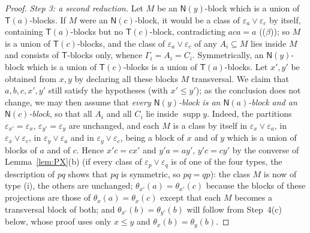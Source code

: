 \documentclass[11pt]{amsart}
\theoremstyle{definition}
\newcommand{\supp}{\operatorname{supp}}
\newcommand{\T}{\mathsf{T}}
\newcommand{\N}{\mathsf{N}}
\begin{document}
\begin{proof}
\emph{Step 3: a second reduction.} Let $M$ be an $\N(y)$-block which is a union of $\T(a)$-blocks. If $M$ were an $\N(c)$-block, it would be a class of $\varepsilon_a\vee\varepsilon_c$ by itself, containing $\T(a)$-blocks but no $\T(c)$-block, contradicting $aca=a$ (($\beta$)); so $M$ is a union of $\T(c)$-blocks, and the class of $\varepsilon_a\vee\varepsilon_c$ of any $A_i\subseteq M$ lies inside $M$ and consists of $\T$-blocks only, whence $\Gamma_i=A_i=C_i$. Symmetrically, an $\N(y)$-block which is a union of $\T(c)$-blocks is a union of $\T(a)$-blocks. Let $x',y'$ be obtained from $x,y$ by declaring all these blocks $M$ transversal. We claim that $a,b,c,x',y'$ still satisfy the hypotheses (with $x'\le y'$); as the conclusion does not change, we may then assume that \emph{every $\N(y)$-block is an $\N(a)$-block and an $\N(c)$-block}, so that all $A_i$ and all $C_i$ lie inside $\supp y$. Indeed, the partitions $\varepsilon_{x'}=\varepsilon_x$, $\varepsilon_{y'}=\varepsilon_y$ are unchanged, and each $M$ is a class by itself in $\varepsilon_x\vee\varepsilon_a$, in $\varepsilon_x\vee\varepsilon_c$, in $\varepsilon_y\vee\varepsilon_a$ and in $\varepsilon_y\vee\varepsilon_c$, being a block of $x$ and of $y$ which is a union of blocks of $a$ and of $c$. Hence $x'c=cx'$ and $y'a=ay'$, $y'c=cy'$ by the converse of Lemma~\ref{lem:PX}(b) (if every class of $\varepsilon_p\vee\varepsilon_q$ is of one of the four types, the description of $pq$ shows that $pq$ is symmetric, so $pq=qp$): the class $M$ is now of type (i), the others are unchanged; $\theta_{x'}(a)=\theta_{x'}(c)$ because the blocks of these projections are those of $\theta_x(a)=\theta_x(c)$ except that each $M$ becomes a transversal block of both; and $\theta_{x'}(b)=\theta_{y'}(b)$ will follow from Step~4(c) below, whose proof uses only $x\le y$ and $\theta_x(b)=\theta_y(b)$.


\end{proof}
\end{document}
